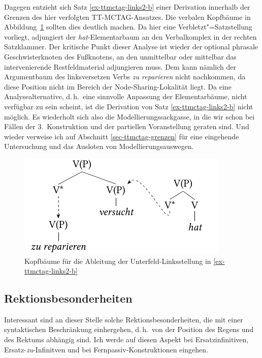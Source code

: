 Dagegen entzieht sich Satz \ref{ex-ttmctag-links2-b} einer Derivation innerhalb der Grenzen des hier verfolgten TT-MCTAG-Ansatzes. Die verbalen Kopfbäume in Abbildung~\ref{fig-ttmctag-links2-2} sollten dies deutlich machen. Da hier eine Verbletzt"=Satzstellung vorliegt, adjungiert der {\it hat}-Elementarbaum an den Verbalkomplex in der rechten Satzklammer. Der kritische Punkt dieser Analyse ist wieder der optional phrasale Geschwisterknoten des Fu\ss knotens, an den unmittelbar oder mittelbar das intervenierende Restfeldmaterial adjungieren muss. Dem kann nämlich der Argumentbaum des linksversetzen Verbs {\it zu reparieren} nicht nachkommen, da diese Position nicht im Bereich der Node-Sharing-Lokalität liegt. Da eine Analysealternative, d.\,h.\ eine sinnvolle Anpassung der Elementarbäume, nicht verfügbar zu sein scheint, ist die Derivation von Satz \ref{ex-ttmctag-links2-b} nicht möglich. Es wiederholt sich also die Modellierungssackgasse, in die wir schon bei Fällen der 3.~Konstruktion und der partiellen Voranstellung geraten sind. Und wieder verweise ich auf Abschnitt \ref{sec-ttmctag-grenzen} für eine eingehende Untersuchung und das Ausloten von Modellierungsauswegen.     

\begin{figure}[t]
\centering
\includegraphics{graphics/abb719.pdf}
\caption{\label{fig-ttmctag-links2-2}Kopfbäume für die Ableitung der Unterfeld-Linksstellung in \ref{ex-ttmctag-links2-b}}
\end{figure}


\subsection{Rektionsbesonderheiten} \label{sec-ttmctag-rekt}

Interessant sind an dieser Stelle solche Rektionsbesonderheiten, die mit einer syntaktischen Beschränkung einhergehen, d.\,h.\ von der Position des Regens und des Rektums abhängig sind. Ich werde auf diesen Aspekt bei Ersatzinfinitiven, Ersatz-\emph{zu}-Infinitven und bei Fernpassiv-Konstruktionen eingehen. 


